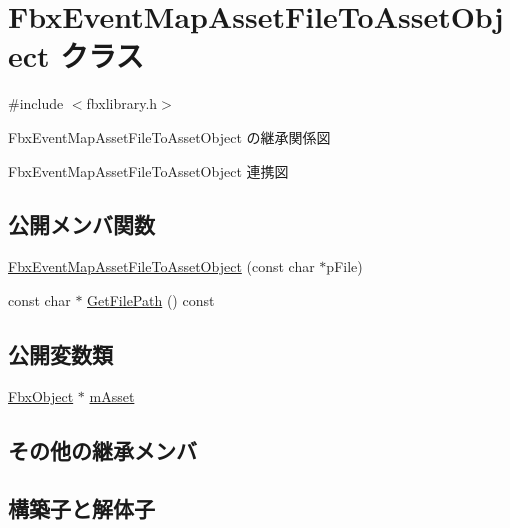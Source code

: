 \hypertarget{class_fbx_event_map_asset_file_to_asset_object}{}\section{Fbx\+Event\+Map\+Asset\+File\+To\+Asset\+Object クラス}
\label{class_fbx_event_map_asset_file_to_asset_object}


{\ttfamily \#include $<$fbxlibrary.\+h$>$}



Fbx\+Event\+Map\+Asset\+File\+To\+Asset\+Object の継承関係図


Fbx\+Event\+Map\+Asset\+File\+To\+Asset\+Object 連携図
\subsection*{公開メンバ関数}
\begin{DoxyCompactItemize}
\item 
\hyperlink{class_fbx_event_map_asset_file_to_asset_object_ad72d55e79ebd2905e725c2bf90794c73}{Fbx\+Event\+Map\+Asset\+File\+To\+Asset\+Object} (const char $\ast$p\+File)
\item 
const char $\ast$ \hyperlink{class_fbx_event_map_asset_file_to_asset_object_a52c6658860c2ee9d3c5fb74d82ad003e}{Get\+File\+Path} () const
\end{DoxyCompactItemize}
\subsection*{公開変数類}
\begin{DoxyCompactItemize}
\item 
\hyperlink{class_fbx_object}{Fbx\+Object} $\ast$ \hyperlink{class_fbx_event_map_asset_file_to_asset_object_a29d3b4f66df038ce5fbf3832a3cd3f31}{m\+Asset}
\end{DoxyCompactItemize}
\subsection*{その他の継承メンバ}


\subsection{構築子と解体子}
\mbox{\label{class_fbx_event_map_asset_file_to_asset_object_ad72d55e79ebd2905e725c2bf90794c73}} 
